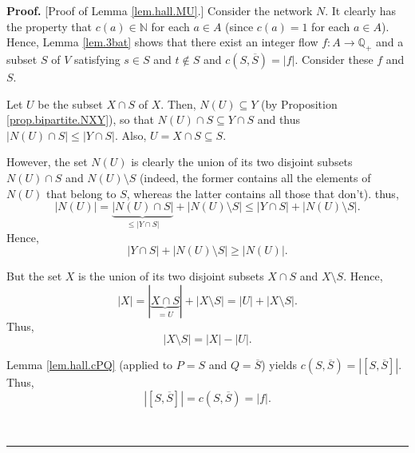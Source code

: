 \documentclass[numbers=enddot,12pt,final,onecolumn,notitlepage]{scrartcl}%
\theoremstyle{definition}
\newenvironment{proof}[1][Proof]{\noindent\textbf{#1.} }{\ \rule{0.5em}{0.5em}}
\begin{document}
\begin{proof}
[Proof of Lemma \ref{lem.hall.MU}.] Consider the network $N$. It clearly has
the property that $c\left(  a\right)  \in\mathbb{N}$ for each $a\in A$ (since
$c\left(  a\right)  =1$ for each $a\in A$). Hence, Lemma \ref{lem.3bat} shows
that there exist an integer flow $f:A\rightarrow\mathbb{Q}_{+}$ and a subset
$S$ of $V$ satisfying $s\in S$ and $t\notin S$ and $c\left(  S,\overline
{S}\right)  =\left\vert f\right\vert $. Consider these $f$ and $S$.

Let $U$ be the subset $X\cap S$ of $X$. Then, $N\left(  U\right)  \subseteq Y$
(by Proposition \ref{prop.bipartite.NXY}), so that $N\left(  U\right)  \cap
S\subseteq Y\cap S$ and thus $\left\vert N\left(  U\right)  \cap S\right\vert
\leq\left\vert Y\cap S\right\vert $. Also, $U=X\cap S\subseteq S$.

However, the set $N\left(  U\right)  $ is clearly the union of its two
disjoint subsets $N\left(  U\right)  \cap S$ and $N\left(  U\right)  \setminus
S$ (indeed, the former contains all the elements of $N\left(  U\right)  $ that
belong to $S$, whereas the latter contains all those that don't). thus,%
\[
\left\vert N\left(  U\right)  \right\vert =\underbrace{\left\vert N\left(
U\right)  \cap S\right\vert }_{\leq\left\vert Y\cap S\right\vert }+\left\vert
N\left(  U\right)  \setminus S\right\vert \leq\left\vert Y\cap S\right\vert
+\left\vert N\left(  U\right)  \setminus S\right\vert .
\]
Hence,%
\begin{equation}
\left\vert Y\cap S\right\vert +\left\vert N\left(  U\right)  \setminus
S\right\vert \geq\left\vert N\left(  U\right)  \right\vert
.\label{pf.thm.hall.hard.3}%
\end{equation}


But the set $X$ is the union of its two disjoint subsets $X\cap S$ and
$X\setminus S$. Hence,
\[
\left\vert X\right\vert =\left\vert \underbrace{X\cap S}_{=U}\right\vert
+\left\vert X\setminus S\right\vert =\left\vert U\right\vert +\left\vert
X\setminus S\right\vert .
\]
Thus,%
\begin{equation}
\left\vert X\setminus S\right\vert =\left\vert X\right\vert -\left\vert
U\right\vert . \label{pf.thm.hall.hard.4}%
\end{equation}


Lemma \ref{lem.hall.cPQ} (applied to $P=S$ and $Q=\overline{S}$) yields
$c\left(  S,\overline{S}\right)  =\left\vert \left[  S,\overline{S}\right]
\right\vert $. Thus,
\begin{equation}
\left\vert \left[  S,\overline{S}\right]  \right\vert =c\left(  S,\overline
{S}\right)  =\left\vert f\right\vert . \label{pf.thm.hall.hard.5}%
\end{equation}



\end{proof}
\end{document}
